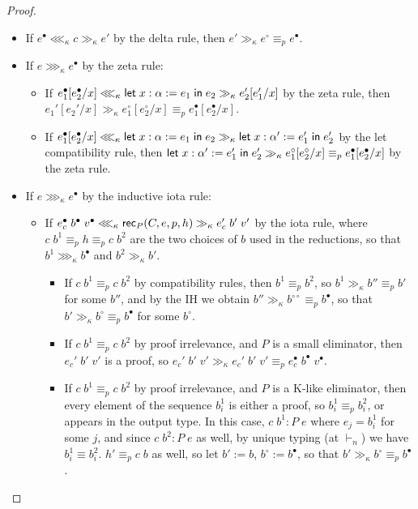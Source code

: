 \begin{proof}
\begin{itemize}
\begin{itemize}
\end{itemize}
\item If $e^\bullet\lll_\kappa c\gg_\kappa e'$ by the delta rule, then $e'\gg_\kappa e^\circ\equiv_p e^\bullet$.
\item If $e\ggg_\kappa e^\bullet$ by the zeta rule:
\begin{itemize}
\item If $e_1^\bullet[e_2^\bullet/x]\lll_\kappa\mathsf{let}\;x:\alpha:=e_1\mathrel{\mathsf{in}}e_2\gg_\kappa e_2'[e_1'/x]$ by the zeta rule, then $e_1'[e_2'/x]\gg_\kappa e_1^\circ[e_2^\circ/x]\equiv_p e_1^\bullet[e_2^\bullet/x]$.
\item If $e_1^\bullet[e_2^\bullet/x]\lll_\kappa\mathsf{let}\;x:\alpha:=e_1\mathrel{\mathsf{in}}e_2\gg_\kappa \mathsf{let}\;x:\alpha':=e_1'\mathrel{\mathsf{in}}e_2'$ by the let compatibility rule, then $\mathsf{let}\;x:\alpha':=e_1'\mathrel{\mathsf{in}}e_2'\gg_\kappa e_1^\circ[e_2^\circ/x]\equiv_p e_1^\bullet[e_2^\bullet/x]$ by the zeta rule.
\end{itemize}
\item If $e\ggg_\kappa e^\bullet$ by the inductive iota rule:
\begin{itemize}
\item If $e_c^\bullet\;b^\bullet\;v^\bullet\lll_\kappa \mathsf{rec}_P(C,e,p,h)\gg_\kappa e_c'\;b'\;v'$ by the iota rule, where $c\;b^1\equiv_p h\equiv_p c\;b^2$ are the two choices of $b$ used in the reductions, so that $b^1\ggg_\kappa b^\bullet$ and $b^2\gg_\kappa b'$. \begin{itemize}
\item If $c\;b^1\equiv_p c\;b^2$ by compatibility rules, then $b^1\equiv_p b^2$, so $b^1\gg_\kappa b''\equiv_p b'$ for some $b''$, and by the IH we obtain $b''\gg_\kappa b^{\circ\circ}\equiv_p b^\bullet$, so that $b'\gg_\kappa b^\circ\equiv_p b^\bullet$ for some $b^\circ$.
\item If $c\;b^1\equiv_p c\;b^2$ by proof irrelevance, and $P$ is a small eliminator, then $e_c'\;b'\;v'$ is a proof, so $e_c'\;b'\;v'\gg_\kappa e_c'\;b'\;v'\equiv_p e_c^\bullet\;b^\bullet\;v^\bullet$.
\item If $c\;b^1\equiv_p c\;b^2$ by proof irrelevance, and $P$ is a K-like eliminator, then every element of the sequence $b^1_i$ is either a proof, so $b^1_i\equiv_p b^2_i$, or appears in the output type. In this case, $c\;b^1:P\;e$ where $e_j=b^1_i$ for some $j$, and since $c\;b^2:P\;e$ as well, by unique typing (at $\vdash_n$) we have $b^1_i\equiv b^2_i$. $h'\equiv_p c\;b$ as well, so let $b':=b$, $b^\circ:=b^\bullet$, so that $b'\gg_\kappa b^\circ\equiv_p b^\bullet$.
\end{itemize}

\end{itemize}
\end{itemize}
\end{proof}
